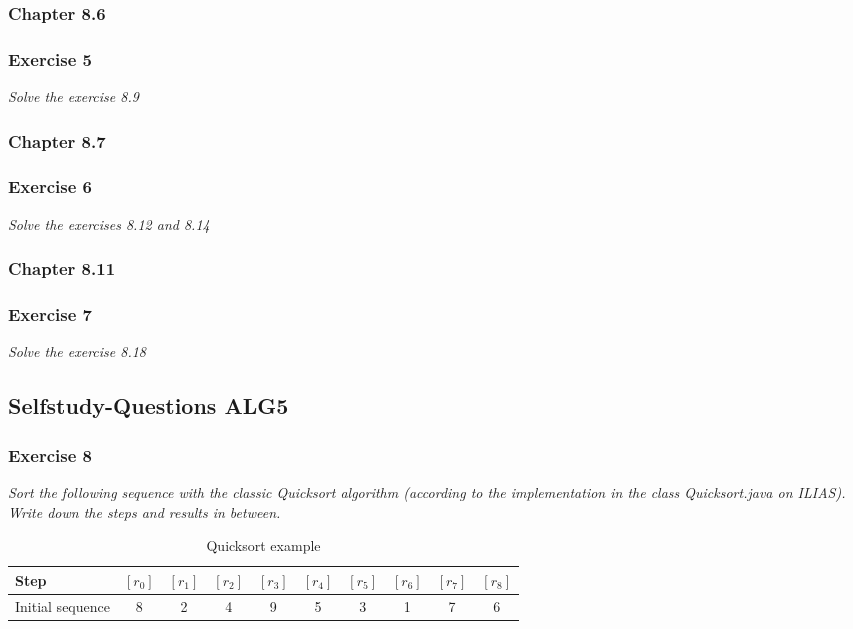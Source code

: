 \subsubsection{Chapter 8.6}

\subsubsection*{Exercise 5}
\textit{Solve the exercise 8.9} \\

\subsubsection{Chapter 8.7}

\subsubsection*{Exercise 6}
\textit{Solve the exercises 8.12 and 8.14} \\

\subsubsection{Chapter 8.11}

\subsubsection*{Exercise 7}
\textit{Solve the exercise 8.18} \\

\subsection{Selfstudy-Questions ALG5}

\subsubsection*{Exercise 8}
\textit{Sort the following sequence with the classic Quicksort algorithm
(according to the implementation in the class Quicksort.java on ILIAS).
Write down the steps and results in between.} \\

\begin{table}[h!]
	\centering
	\begin{tabular}{l c  c  c  c  c  c  c  c  c }
		Step & $[r_0]$ &$[r_1]$ &$[r_2]$ &$[r_3]$ &$[r_4]$ 
			&$[r_5]$ &$[r_6]$ &$[r_7]$ &$[r_8]$ \\ 
		\hline
		Initial sequence & 8 & 2 & 4 & 9 & 5 & 3 & 1 & 7 & 6 \\
		\hline
	\end{tabular}
	\caption{Quicksort example}
\end{table}

